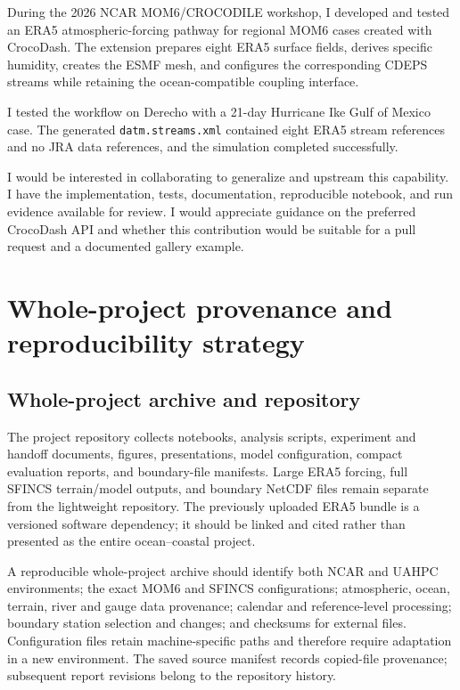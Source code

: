 \documentclass[11pt]{article}
\newcommand{\code}[1]{\texttt{#1}}
\begin{document}
\begin{keybox}
During the 2026 NCAR MOM6/CROCODILE workshop, I developed and tested an ERA5 atmospheric-forcing pathway for regional MOM6 cases created with CrocoDash. The extension prepares eight ERA5 surface fields, derives specific humidity, creates the ESMF mesh, and configures the corresponding CDEPS streams while retaining the ocean-compatible coupling interface.

I tested the workflow on Derecho with a 21-day Hurricane Ike Gulf of Mexico case. The generated \code{datm.streams.xml} contained eight ERA5 stream references and no JRA data references, and the simulation completed successfully.

I would be interested in collaborating to generalize and upstream this capability. I have the implementation, tests, documentation, reproducible notebook, and run evidence available for review. I would appreciate guidance on the preferred CrocoDash API and whether this contribution would be suitable for a pull request and a documented gallery example.
\end{keybox}

\section{Whole-project provenance and reproducibility strategy}

\subsection{Whole-project archive and repository}

The project repository collects notebooks, analysis scripts, experiment and handoff documents, figures, presentations, model configuration, compact evaluation reports, and boundary-file manifests. Large ERA5 forcing, full SFINCS terrain/model outputs, and boundary NetCDF files remain separate from the lightweight repository. The previously uploaded ERA5 bundle is a versioned software dependency; it should be linked and cited rather than presented as the entire ocean--coastal project.

A reproducible whole-project archive should identify both NCAR and UAHPC environments; the exact MOM6 and SFINCS configurations; atmospheric, ocean, terrain, river and gauge data provenance; calendar and reference-level processing; boundary station selection and changes; and checksums for external files. Configuration files retain machine-specific paths and therefore require adaptation in a new environment. The saved source manifest records copied-file provenance; subsequent report revisions belong to the repository history.
\end{document}
